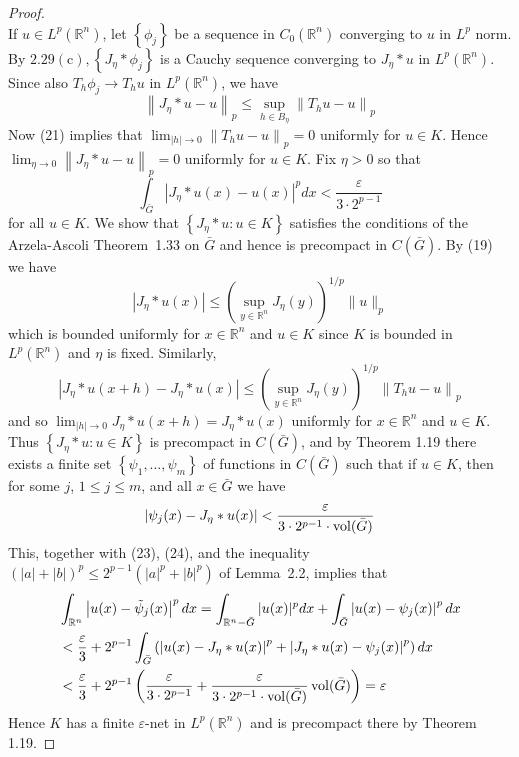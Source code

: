 \begin{proof}
\[  \]
  If $u \in L^p(\mathbb{R}^n)$, let $\left\{\phi_j\right\}$ be a sequence in $C_0(\mathbb{R}^n)$ converging to $u$ in $L^p$ norm. By $2.29(\mathrm{c}),\left\{J_\eta * \phi_j\right\}$ is a Cauchy sequence converging to $J_\eta * u$ in $L^p(\mathbb{R}^n)$. Since also $T_h \phi_j \rightarrow T_h u$ in $L^p(\mathbb{R}^n)$, we have
  \[
  \left\|J_\eta * u-u\right\|_p \leq \sup _{h \in B_\eta}\left\|T_h u-u\right\|_p
  \]
  Now (21) implies that $\lim _{|h| \rightarrow 0}\left\|T_h u-u\right\|_p=0$ uniformly for $u \in K$. Hence $\lim _{\eta \rightarrow 0}\left\|J_\eta * u-u\right\|_p=0$ uniformly for $u \in K$. Fix $\eta>0$ so that
  \[
  \int_{\bar{G}}\left|J_\eta * u(x)-u(x)\right|^p d x<\frac{\varepsilon}{3 \cdot 2^{p-1}}
  \]
  for all $u \in K$.
  We show that $\left\{J_\eta * u: u \in K\right\}$ satisfies the conditions of the Arzela-Ascoli Theorem~1.33 on $\bar{G}$ and hence is precompact in $C(\bar{G})$. By (19) we have
  \[
  \left|J_\eta * u(x)\right| \leq\left(\sup _{y \in \mathbb{R}^n} J_\eta(y)\right)^{1 / p}\|u\|_p
  \]
  which is bounded uniformly for $x \in \mathbb{R}^n$ and $u \in K$ since $K$ is bounded in $L^p(\mathbb{R}^n)$ and $\eta$ is fixed. Similarly,
  \[
  \left|J_\eta * u(x+h)-J_\eta * u(x)\right| \leq\left(\sup _{y \in \mathbb{R}^n} J_\eta(y)\right)^{1 / p}\left\|T_h u-u\right\|_p
  \]
  and so $\lim _{|h| \rightarrow 0} J_\eta * u(x+h)=J_\eta * u(x)$ uniformly for $x \in \mathbb{R}^n$ and $u \in K$. Thus $\left\{J_\eta * u: u \in K\right\}$ is precompact in $C(\bar{G})$, and by Theorem 1.19 there exists a finite set $\left\{\psi_1, \ldots, \psi_m\right\}$ of functions in $C(\bar{G})$ such that if $u \in K$, then for some $j$, $1 \leq j \leq m$, and all $x \in \bar{G}$ we have
  \[
  \left|\psi_j(x)-J_\eta * u(x)\right|<\frac{\varepsilon}{3 \cdot 2^{p-1} \cdot \operatorname{vol}(\bar{G})}
  \]
  This, together with (23), (24), and the inequality $(|a|+|b|)^p \leq 2^{p-1}\left(|a|^p+|b|^p\right)$ of Lemma~2.2, implies that
  \[
  \begin{aligned}
  & \int_{\mathbb{R}^n}\left|u(x)-\tilde{\psi}_j(x)\right|^p d x=\int_{\mathbb{R}^n-\bar{G}}|u(x)|^p d x+\int_{\bar{G}}\left|u(x)-\psi_j(x)\right|^p d x \\
  &<\frac{\varepsilon}{3}+2^{p-1} \int_{\bar{G}}\left(\left|u(x)-J_\eta * u(x)\right|^p+\left|J_\eta * u(x)-\psi_j(x)\right|^p\right) d x \\
  &<\frac{\varepsilon}{3}+2^{p-1}\left(\frac{\varepsilon}{3 \cdot 2^{p-1}}+\frac{\varepsilon}{3 \cdot 2^{p-1} \cdot \operatorname{vol}(\bar{G})} \operatorname{vol}(\bar{G})\right)=\varepsilon
  \end{aligned}
  \]
  Hence $K$ has a finite $\varepsilon$-net in $L^p(\mathbb{R}^n)$ and is precompact there by Theorem 1.19.
\end{proof}


